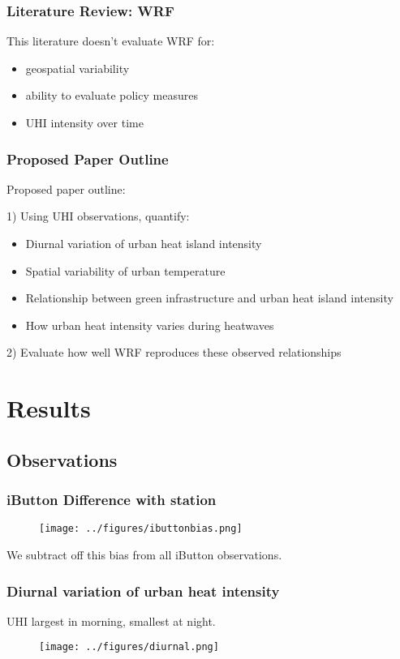 \documentclass[aspectratio=169, 10pt]{beamer}
\begin{document}
\begin{frame}
\frametitle{Literature Review: WRF}
This literature doesn't evaluate WRF for: 
\begin{itemize}
\item geospatial variability
\item ability to evaluate policy measures
\item UHI intensity over time
\end{itemize}
\end{frame}

\begin{frame}
\frametitle{Proposed Paper Outline}

Proposed paper outline: 


1) Using UHI observations, quantify: 
\begin{itemize}
\item Diurnal variation of urban heat island intensity
\item Spatial variability of urban temperature
\item Relationship between green infrastructure and urban heat island intensity
\item How urban heat intensity varies during heatwaves
\end{itemize}
2) Evaluate how well WRF reproduces these observed relationships 
\end{frame}
\section{Results}

\subsection{Observations}
\begin{frame}
\frametitle{iButton Difference with station}

\begin{figure}
\texttt{[image: ../figures/ibuttonbias.png]}
\end{figure}

We subtract off this bias from all iButton observations. 
\end{frame}

\begin{frame}
\frametitle{Diurnal variation of urban heat intensity}
UHI largest in morning, smallest at night. 
\begin{figure}
\texttt{[image: ../figures/diurnal.png]}
\end{figure}
\end{frame}
\end{document}
